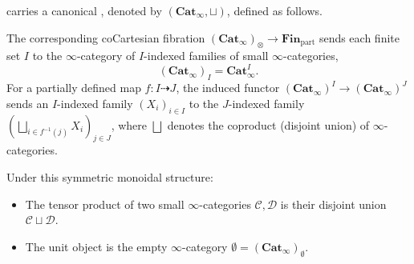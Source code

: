 \begin{definition} \label{definition:symmetric_monoidal_structure_on_Cat_infinity_via_disjoint_union}
 carries a canonical , denoted by $(\mathbf{Cat}_\infty, \sqcup)$, defined as follows.

The corresponding coCartesian fibration $(\mathbf{Cat}_\infty)_\otimes \to \mathbf{Fin}_{\mathrm{part}}$ sends each finite set $I$ to the $\infty$-category of $I$-indexed families of small $\infty$-categories,
\[ (\mathbf{Cat}_\infty)_I = \mathbf{Cat}_\infty^I. \]
For a partially defined map $f : I \dashrightarrow J$, the induced functor $(\mathbf{Cat}_\infty)^I \to (\mathbf{Cat}_\infty)^J$ sends an $I$-indexed family $(X_i)_{i \in I}$ to the $J$-indexed family $\left(\bigsqcup_{i \in f^{-1}(j)} X_i\right)_{j \in J}$, where $\bigsqcup$ denotes the coproduct (disjoint union) of $\infty$-categories.

Under this symmetric monoidal structure:
\begin{itemize}
    \item The tensor product of two small $\infty$-categories $\mathcal{C}, \mathcal{D}$ is their disjoint union $\mathcal{C} \sqcup \mathcal{D}$.
    \item The unit object is the empty $\infty$-category $\emptyset = (\mathbf{Cat}_\infty)_\emptyset$.
\end{itemize}
\end{definition}

